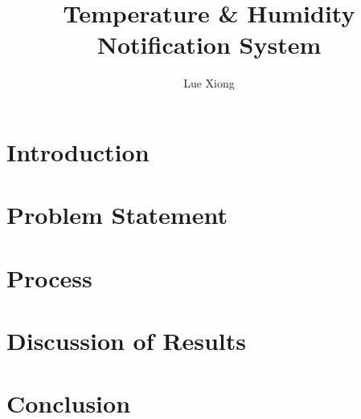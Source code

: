 \documentclass{article}
\title{Temperature \& Humidity Notification System}
\author{Lue Xiong}
\begin{document}
\maketitle
\newpage

\tableofcontents
\newpage

\obeylines

\section{Introduction}

\section{Problem Statement}

\section{Process}

  


\section{Discussion of Results}

\section{Conclusion}
\end{document}

